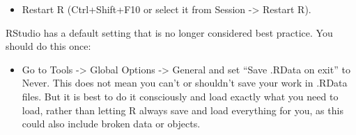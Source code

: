 \documentclass[12pt,]{krantz}
\providecommand{\tightlist}{%
  \setlength{\itemsep}{0pt}\setlength{\parskip}{0pt}}
\theoremstyle{definition}
\theoremstyle{definition}
\theoremstyle{definition}
\theoremstyle{remark}
\begin{document}
\begin{itemize}
\tightlist
\item
  Restart R (Ctrl+Shift+F10 or select it from Session -\textgreater{}
  Restart R).
\end{itemize}

RStudio has a default setting that is no longer considered best
practice. You should do this once:

\begin{itemize}
\tightlist
\item
  Go to Tools -\textgreater{} Global Options -\textgreater{} General and
  set ``Save .RData on exit'' to Never. This does not mean you can't or
  shouldn't save your work in .RData files. But it is best to do it
  consciously and load exactly what you need to load, rather than
  letting R always save and load everything for you, as this could also
  include broken data or objects.
\end{itemize}



\backmatter
\printindex
\end{document}
